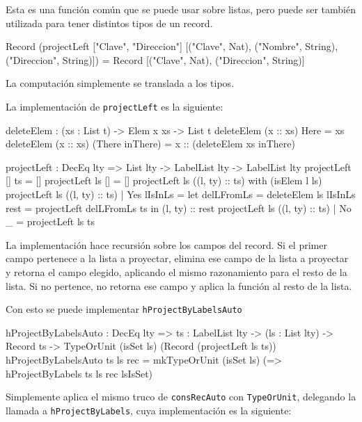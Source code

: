 Esta es una función común que se puede usar sobre listas, pero puede ser también utilizada para tener distintos tipos de un record.

\begin{code}
Record (projectLeft ["Clave", "Direccion"]
  [("Clave", Nat), ("Nombre", String), ("Direccion", String)]) =
Record [("Clave", Nat), ("Direccion", String)]
\end{code}

La computación simplemente se translada a los tipos.

La implementación de \texttt{projectLeft} es la siguiente:

\begin{code}
deleteElem : (xs : List t) -> Elem x xs -> List t
deleteElem (x :: xs) Here = xs
deleteElem (x :: xs) (There inThere) =
  x :: (deleteElem xs inThere)

projectLeft : DecEq lty => List lty -> LabelList lty ->
  LabelList lty
projectLeft [] ts = []
projectLeft ls [] = []
projectLeft ls ((l, ty) :: ts) with (isElem l ls)
  projectLeft ls ((l, ty) :: ts) | Yes lIsInLs =
    let delLFromLs = deleteElem ls lIsInLs
      rest = projectLeft delLFromLs ts
    in (l, ty) :: rest
  projectLeft ls ((l, ty) :: ts) | No _ = projectLeft ls ts
\end{code}

La implementación hace recursión sobre los campos del record. Si el primer campo pertenece a la lista a proyectar, elimina ese campo de la lista a proyectar y retorna el campo elegido, aplicando el mismo razonamiento para el resto de la lista. Si no pertence, no retorna ese campo y aplica la función al resto de la lista.

Con esto se puede implementar \texttt{hProjectByLabelsAuto}

\begin{code}
hProjectByLabelsAuto : DecEq lty => {ts : LabelList lty} ->
  (ls : List lty) -> Record ts ->
  TypeOrUnit (isSet ls) (Record (projectLeft ls ts))
hProjectByLabelsAuto {ts} ls rec =
  mkTypeOrUnit (isSet ls) (\lsIsSet =>
    hProjectByLabels {ts} ls rec lsIsSet)
\end{code}

Simplemente aplica el mismo truco de \texttt{consRecAuto} con \texttt{TypeOrUnit}, delegando la llamada a \texttt{hProjectByLabels}, cuya implementación es la siguiente:


